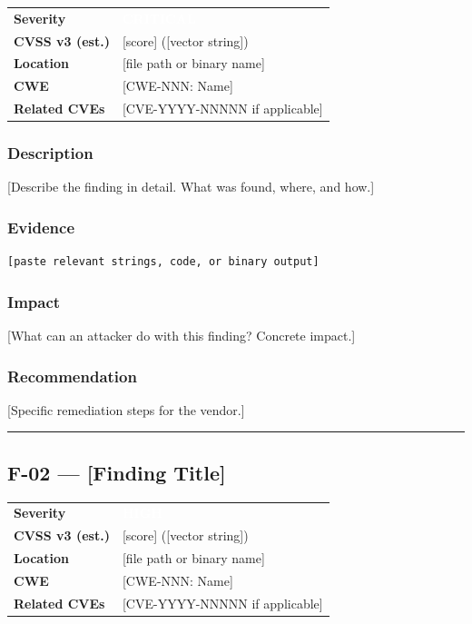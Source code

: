 \documentclass[12pt,a4paper]{article}
\newcommand{\critical}[1]{\textcolor{white}{\colorbox{critical}{\textbf{#1}}}}
\newcommand{\high}[1]{\textcolor{white}{\colorbox{high}{\textbf{#1}}}}
\begin{document}
\begin{tabularx}{\linewidth}{lX}
  \toprule
  \textbf{Severity}       & \critical{CRITICAL} \\
  \rowcolor{rowalt}
  \textbf{CVSS v3 (est.)} & [score] ([vector string]) \\
  \textbf{Location}       & [file path or binary name] \\
  \rowcolor{rowalt}
  \textbf{CWE}            & [CWE-NNN: Name] \\
  \textbf{Related CVEs}   & [CVE-YYYY-NNNNN if applicable] \\
  \bottomrule
\end{tabularx}

\subsubsection*{Description}
[Describe the finding in detail. What was found, where, and how.]

\subsubsection*{Evidence}
\begin{lstlisting}
[paste relevant strings, code, or binary output]
\end{lstlisting}

\subsubsection*{Impact}
[What can an attacker do with this finding? Concrete impact.]

\subsubsection*{Recommendation}
[Specific remediation steps for the vendor.]

\bigskip\hrule\bigskip

\subsection*{F-02 — [Finding Title]}

\begin{tabularx}{\linewidth}{lX}
  \toprule
  \textbf{Severity}       & \high{HIGH} \\
  \rowcolor{rowalt}
  \textbf{CVSS v3 (est.)} & [score] ([vector string]) \\
  \textbf{Location}       & [file path or binary name] \\
  \rowcolor{rowalt}
  \textbf{CWE}            & [CWE-NNN: Name] \\
  \textbf{Related CVEs}   & [CVE-YYYY-NNNNN if applicable] \\
  \bottomrule
\end{tabularx}
\end{document}
